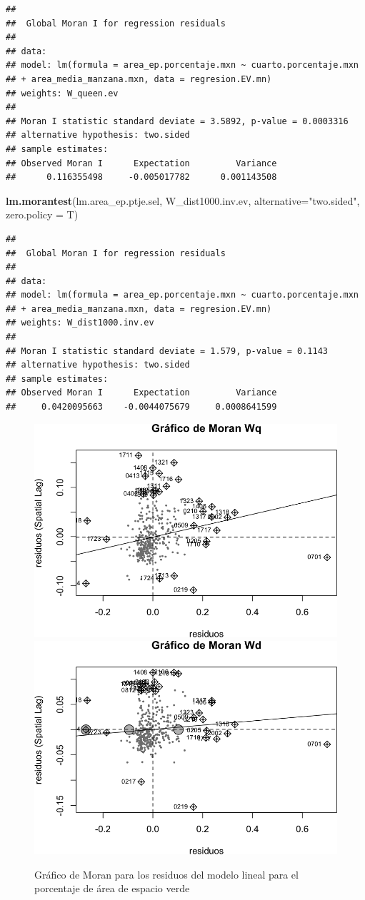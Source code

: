 \documentclass[12pt,]{book}
\newenvironment{Shaded}{\begin{snugshade}}{\end{snugshade}}
\newcommand{\KeywordTok}[1]{\textcolor[rgb]{0.13,0.29,0.53}{\textbf{#1}}}
\newcommand{\DataTypeTok}[1]{\textcolor[rgb]{0.13,0.29,0.53}{#1}}
\newcommand{\StringTok}[1]{\textcolor[rgb]{0.31,0.60,0.02}{#1}}
\newcommand{\NormalTok}[1]{#1}
\begin{document}
\begin{verbatim}
## 
##  Global Moran I for regression residuals
## 
## data:  
## model: lm(formula = area_ep.porcentaje.mxn ~ cuarto.porcentaje.mxn
## + area_media_manzana.mxn, data = regresion.EV.mn)
## weights: W_queen.ev
## 
## Moran I statistic standard deviate = 3.5892, p-value = 0.0003316
## alternative hypothesis: two.sided
## sample estimates:
## Observed Moran I      Expectation         Variance 
##      0.116355498     -0.005017782      0.001143508
\end{verbatim}

\begin{Shaded}
\begin{Highlighting}[]
\KeywordTok{lm.morantest}\NormalTok{(lm.area_ep.ptje.sel, }
\NormalTok{             W_dist1000.inv.ev,}
             \DataTypeTok{alternative=}\StringTok{"two.sided"}\NormalTok{,}
             \DataTypeTok{zero.policy =}\NormalTok{ T)}
\end{Highlighting}
\end{Shaded}

\begin{verbatim}
## 
##  Global Moran I for regression residuals
## 
## data:  
## model: lm(formula = area_ep.porcentaje.mxn ~ cuarto.porcentaje.mxn
## + area_media_manzana.mxn, data = regresion.EV.mn)
## weights: W_dist1000.inv.ev
## 
## Moran I statistic standard deviate = 1.579, p-value = 0.1143
## alternative hypothesis: two.sided
## sample estimates:
## Observed Moran I      Expectation         Variance 
##     0.0420095663    -0.0044075679     0.0008641599
\end{verbatim}

\begin{figure}
\includegraphics[width=0.49\linewidth]{tesis-unigis_files/figure-latex/moranplot-resareaep-w-1} \includegraphics[width=0.49\linewidth]{tesis-unigis_files/figure-latex/moranplot-resareaep-w-2} \caption{Gráfico de Moran para los residuos del modelo lineal para el porcentaje de área de espacio verde}\label{fig:moranplot-resareaep-w}
\end{figure}
\end{document}
